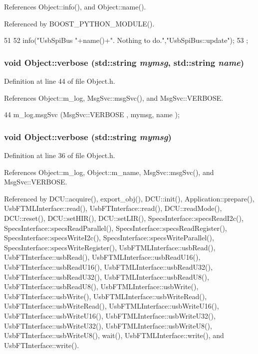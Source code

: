 References Object::info(), and Object::name().

Referenced by BOOST\_\-PYTHON\_\-MODULE().


\begin{DoxyCode}
51                  {
52     info("UsbSpiBus "+name()+". Nothing to do.","UsbSpiBus::update");
53   };
\end{DoxyCode}
\hypertarget{classObject_a2d4120195317e2a3c6532e8bb9f3da68}{
\subsubsection[{verbose}]{\setlength{\rightskip}{0pt plus 5cm}void Object::verbose (std::string {\em mymsg}, \/  std::string {\em name})}}
\label{classObject_a2d4120195317e2a3c6532e8bb9f3da68}


Definition at line 44 of file Object.h.

References Object::m\_\-log, MsgSvc::msgSvc(), and MsgSvc::VERBOSE.


\begin{DoxyCode}
44 { m_log.msgSvc (MsgSvc::VERBOSE , mymsg, name ); }
\end{DoxyCode}
\hypertarget{classObject_a83d2db2df682907ea1115ad721c1c4a1}{
\subsubsection[{verbose}]{\setlength{\rightskip}{0pt plus 5cm}void Object::verbose (std::string {\em mymsg})}}
\label{classObject_a83d2db2df682907ea1115ad721c1c4a1}


Definition at line 36 of file Object.h.

References Object::m\_\-log, Object::m\_\-name, MsgSvc::msgSvc(), and MsgSvc::VERBOSE.

Referenced by DCU::acquire(), export\_\-obj(), DCU::init(), Application::prepare(), UsbFTMLInterface::read(), UsbFTInterface::read(), DCU::readMode(), DCU::reset(), DCU::setHIR(), DCU::setLIR(), SpecsInterface::specsReadI2c(), SpecsInterface::specsReadParallel(), SpecsInterface::specsReadRegister(), SpecsInterface::specsWriteI2c(), SpecsInterface::specsWriteParallel(), SpecsInterface::specsWriteRegister(), UsbFTMLInterface::usbRead(), UsbFTInterface::usbRead(), UsbFTMLInterface::usbReadU16(), UsbFTInterface::usbReadU16(), UsbFTMLInterface::usbReadU32(), UsbFTInterface::usbReadU32(), UsbFTMLInterface::usbReadU8(), UsbFTInterface::usbReadU8(), UsbFTMLInterface::usbWrite(), UsbFTInterface::usbWrite(), UsbFTMLInterface::usbWriteRead(), UsbFTInterface::usbWriteRead(), UsbFTMLInterface::usbWriteU16(), UsbFTInterface::usbWriteU16(), UsbFTMLInterface::usbWriteU32(), UsbFTInterface::usbWriteU32(), UsbFTMLInterface::usbWriteU8(), UsbFTInterface::usbWriteU8(), wait(), UsbFTMLInterface::write(), and UsbFTInterface::write().



